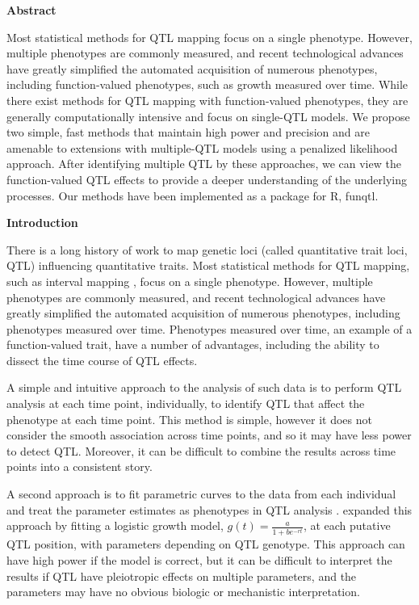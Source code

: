 \documentclass[12pt,letterpaper]{article}
\begin{document}
\newpage

\centerline{\sffamily \textbf{Abstract}}
Most statistical methods for QTL mapping focus on a single phenotype.
However, multiple phenotypes are commonly measured, and recent
technological advances have greatly simplified the automated
acquisition of numerous phenotypes, including function-valued
phenotypes, such as growth measured over time. While there exist
methods for QTL mapping with function-valued phenotypes, they are
generally computationally intensive and focus on single-QTL models. We
propose two simple, fast methods that maintain high power and precision
and are amenable to extensions with multiple-QTL models using
a penalized likelihood approach.  After
identifying multiple QTL by these approaches, we can view the
function-valued QTL effects to provide a deeper understanding of the
underlying processes.  Our methods have been implemented as a package
for R, funqtl.

\newpage

\centerline{\sffamily \textbf{Introduction}}

There is a long history of work to map genetic loci (called
quantitative trait loci, QTL) influencing
quantitative traits. Most statistical methods for QTL mapping,
such as interval mapping \citep{Lander1989},
focus on a single phenotype.
However, multiple phenotypes are commonly measured, and recent
technological advances have greatly simplified the automated
acquisition of numerous phenotypes, including phenotypes measured over
time. Phenotypes measured over time, an example of a
function-valued trait, have a number of advantages, including the
ability to dissect the time course of QTL effects.

A simple and intuitive approach to the analysis of such data is to
perform QTL analysis
at each time point, individually, to identify QTL that affect the
phenotype at each time point. This method is simple, however it
does not consider the smooth association across time points, and so it may
have less power to detect QTL. Moreover, it can be difficult to
combine the results across time
points into a consistent story.

A second approach is to fit parametric curves to the data from each
individual and treat the parameter estimates as phenotypes in QTL
analysis \citep[e.g., see][]{Kendziorski2002}. \citet{Ma2002} expanded this approach by fitting
a logistic growth model, $g(t) = \frac{a}{1+b e^{-rt}}$, at each
putative QTL position, with parameters depending on QTL genotype.
This approach can have
high power if the model is correct, but it can be difficult to
interpret the results if QTL have pleiotropic effects on multiple
parameters, and the parameters may have no obvious biologic or
mechanistic interpretation.
\end{document}
